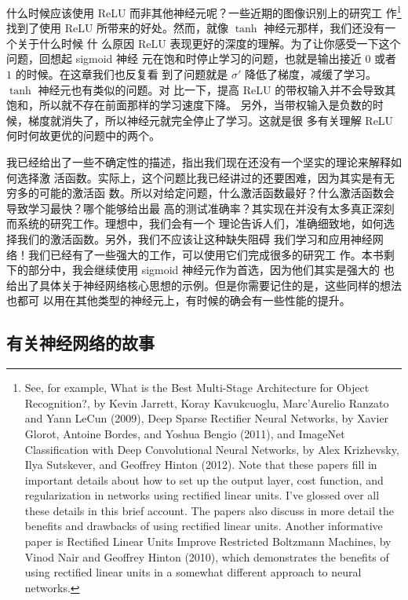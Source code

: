 什么时候应该使用 ReLU 而非其他神经元呢？一些近期的图像识别上的研究工
作\footnote{See, for example, What is the Best Multi-Stage Architecture for
  Object Recognition?, by Kevin Jarrett, Koray Kavukcuoglu, Marc'Aurelio Ranzato
  and Yann LeCun (2009), Deep Sparse Rectiﬁer Neural Networks, by Xavier Glorot,
  Antoine Bordes, and Yoshua Bengio (2011), and ImageNet Classification with
  Deep Convolutional Neural Networks, by Alex Krizhevsky, Ilya Sutskever, and
  Geoffrey Hinton (2012). Note that these papers fill in important details about
  how to set up the output layer, cost function, and regularization in networks
  using rectified linear units. I've glossed over all these details in this
  brief account. The papers also discuss in more detail the benefits and
  drawbacks of using rectified linear units. Another informative paper is
  Rectified Linear Units Improve Restricted Boltzmann Machines, by Vinod Nair
  and Geoffrey Hinton (2010), which demonstrates the benefits of using rectified
  linear units in a somewhat different approach to neural networks.}找到了使用
ReLU 所带来的好处。然而，就像 $\tanh$ 神经元那样，我们还没有一个关于什么时候 什
么原因 ReLU 表现更好的深度的理解。为了让你感受一下这个问题，回想起 sigmoid 神经
元在饱和时停止学习的问题，也就是输出接近 $0$ 或者 $1$ 的时候。在这章我们也反复看
到了问题就是 $\sigma'$ 降低了梯度，减缓了学习。$\tanh$ 神经元也有类似的问题。对
比一下，提高 ReLU 的带权输入并不会导致其饱和，所以就不存在前面那样的学习速度下降。
另外，当带权输入是负数的时候，梯度就消失了，所以神经元就完全停止了学习。这就是很
多有关理解 ReLU 何时何故更优的问题中的两个。

我已经给出了一些不确定性的描述，指出我们现在还没有一个坚实的理论来解释如何选择激
活函数。实际上，这个问题比我已经讲过的还要困难，因为其实是有无穷多的可能的激活函
数。所以对给定问题，什么激活函数最好？什么激活函数会导致学习最快？哪个能够给出最
高的测试准确率？其实现在并没有太多真正深刻而系统的研究工作。理想中，我们会有一个
理论告诉人们，准确细致地，如何选择我们的激活函数。另外，我们不应该让这种缺失阻碍
我们学习和应用神经网络！我们已经有了一些强大的工作，可以使用它们完成很多的研究工
作。本书剩下的部分中，我会继续使用 sigmoid 神经元作为首选，因为他们其实是强大的
也给出了具体关于神经网络核心思想的示例。但是你需要记住的是，这些同样的想法也都可
以用在其他类型的神经元上，有时候的确会有一些性能的提升。

\subsection{有关神经网络的故事}

